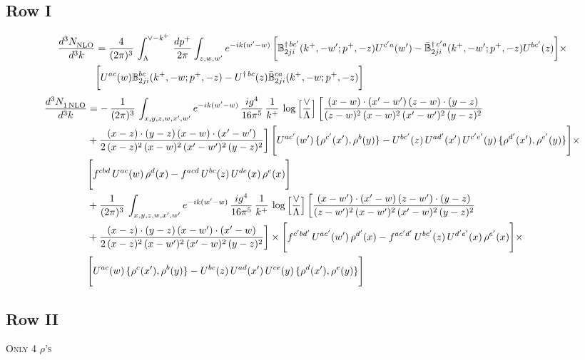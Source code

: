 \documentclass[9pt]{article}
\def\mf#1{\mathbb{#1}}
\numberwithin{equation}{section}
\begin{document}
\subsection{{\color{green}Row I}}
\begin{align}
    \frac{d^{3}N_{\rm NLO}^{\rm}}{d^{3}k}  & = \frac{4}{(2\pi)^{3}}\,\int_{\Lambda}^{\vee-k^{+}}\, \frac{dp^{+}}{2\pi}\int_{z,w,w^{\prime}} e^{-ik(w^{\prime}-w)}\, \bigg[\mf{B}^{\dagger\, bc^{\prime}}_{2ji}(k^{+},-w^{\prime};p^{+},-z)U^{ c^{\prime}a}(w^{\prime}) -\Bar{\mf{B}}^{\dagger\, c^{\prime}a}_{2ji}(k^{+},-w^{\prime}; p^{+},-z)U^{bc^{\prime}}(z)\bigg]\times\notag \\ & \bigg[U^{ac}(w) \mf{B}^{bc}_{2ji}(k^{+},-w;p^{+},-z) -U^{\dagger\, bc}(z)\Bar{\mf{B}}^{ca}_{2ji}(k^{+},-w; p^{+},-z)\bigg]\nonumber
\end{align}
\begin{align}
 \frac{d^{3}N_{1\,\rm NLO}^{\rm}}{d^{3}k}  & =   -\, \frac{1}{(2\pi)^{3}}\,\int_{x,y,z,w,x',w^{\prime}} e^{-ik(w^{\prime}-w)}\,\frac{ig^{4}}{16\pi^{5}}\,\frac{1}{k^{+}}\,\log{\left[\frac{\vee}{\Lambda}\right]}\,\bigg[\frac{(x-w)\cdot (x'-w')\,(z-w)\cdot (y-z)}{(z-w)^{2}\,(x-w)^{2}\,(x'-w')^{2}\,(y-z)^{2}}\notag \\ & +\frac{(x-z)\cdot (y-z)\,(x-w)\cdot (x'-w')}{2\,(x-z)^{2}\, (x-w)^{2}\,(x'-w')^{2}\,(y-z)^{2}}\bigg]\, \Bigg[U^{ac'}(w')\,\{\rho^{c'}(x'),\rho^{b}(y)\}-U^{bc'}(z)\,U^{ad'}(x')\,U^{c'e'}(y)\, \{\rho^{d'}(x'),\rho^{e'}(y)\}\Bigg]\times \notag \\ & \Bigg[f^{cbd}\,U^{ac}(w)\,\rho^{d}(x)-f^{acd}\, U^{bc}(z)\,U^{de}(x)\,\rho^{e}(x)\Bigg]\notag \\ & + \frac{1}{(2\pi)^{3}}\,\int_{x,y,z,w,x',w^{\prime}} e^{-ik(w^{\prime}-w)}\,\frac{ig^{4}}{16\pi^{5}}\,\frac{1}{k^{+}}\,\log{\left[\frac{\vee}{\Lambda}\right]} \,\bigg[\frac{(x-w')\cdot (x'-w)\,(z-w')\cdot (y-z)}{(z-w')^{2}\,(x-w')^{2}\,(x'-w)^{2}\,(y-z)^{2}}\notag \\ & +\frac{(x-z)\cdot (y-z)\,(x-w')\cdot (x'-w)}{2\,(x-z)^{2}\, (x-w')^{2}\,(x'-w)^{2}\,(y-z)^{2}}\bigg] \times\Bigg[f^{c'bd'}\,U^{ac'}(w')\,\rho^{d'}(x)-f^{ac'd'}\, U^{bc'}(z)\,U^{d'e'}(x)\,\rho^{e'}(x)\Bigg] \times \notag \\ & \Bigg[U^{ac}(w)\,\{\rho^{c}(x'),\rho^{b}(y)\}-U^{bc}(z)\,U^{ad}(x')\,U^{ce}(y)\, \{\rho^{d}(x'),\rho^{e}(y)\}\Bigg]
\end{align}
\subsection{Row II}
\textsc{Only 4 $\rho$'s}
\end{document}
